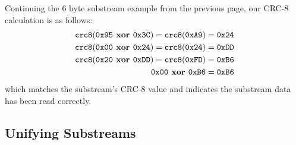 Continuing the 6 byte substream example from the previous page,
our CRC-8 calculation is as follows:
\begin{align*}
  \texttt{crc8}(\texttt{0x95} \textbf{ xor } \texttt{0x3C}) = \texttt{crc8}(\texttt{0xA9}) &= \texttt{0x24} \\
  \texttt{crc8}(\texttt{0x00} \textbf{ xor } \texttt{0x24}) = \texttt{crc8}(\texttt{0x24}) &= \texttt{0xDD} \\
  \texttt{crc8}(\texttt{0x20} \textbf{ xor } \texttt{0xDD}) = \texttt{crc8}(\texttt{0xFD}) &= \texttt{0xB6} \\
  \texttt{0x00} \textbf{ xor } \texttt{0xB6} &= \texttt{0xB6}
\end{align*}
which matches the substream's CRC-8 value
and indicates the substream data has been read correctly.

\clearpage

\subsection{Unifying Substreams}
\label{mlp:unify_substreams}

